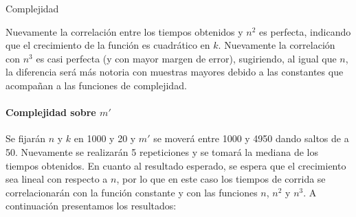 \begin{subsection}{Complejidad}

Nuevamente la correlación entre los tiempos obtenidos y $n^2$ es perfecta, indicando que el crecimiento de la función es cuadrático en $k$. Nuevamente la correlación con $n^3$ es casi perfecta (y con mayor margen de error), sugiriendo, al igual que $n$, la diferencia será más notoria con muestras mayores debido a las constantes que acompañan a las funciones de complejidad. 


\paragraph{Complejidad sobre $m'$}

Se fijarán $n$ y $k$ en 1000 y 20 y $m'$ se moverá entre 1000 y 4950 dando saltos de a 50. Nuevamente se realizarán 5 repeticiones y se tomará la mediana de los tiempos obtenidos. En cuanto al resultado esperado, se espera que el crecimiento sea lineal con respecto a $n$, por lo que en este caso los tiempos de corrida se correlacionarán con la función constante y con las funciones $n$, $n^2$ y $n^3$. A continuación presentamos los resultados:


\end{subsection}
